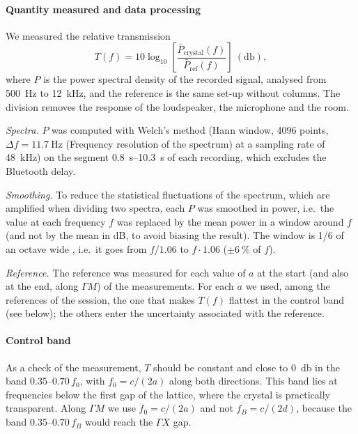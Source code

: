 \documentclass[9pt,a4paper,twocolumn]{extarticle}
\newcommand{\pbreak}{\par\vspace{3pt}}
\begin{document}
\paragraph{Quantity measured and data processing}
We measured the relative transmission
\begin{equation}
  T(f) = 10\log_{10}\!\left[\frac{\bar P_{\mathrm{crystal}}(f)}{\bar P_{\mathrm{ref}}(f)}\right]\ (\si{\decibel}),
\end{equation}
where $P$ is the power spectral density of the recorded signal, analysed from \SI{500}{\hertz} to \SI{12}{\kilo\hertz}, and the reference is the same set-up without columns. The division removes the response of the loudspeaker, the microphone and the room.
\pbreak
\emph{Spectra.} $P$ was computed with Welch's method (Hann window, 4096 points, $\Delta f = \SI{11.7}{\hertz}$ (Frequency resolution of the spectrum) at a sampling rate of \SI{48}{\kilo\hertz}) on the segment \SIrange{0.8}{10.3}{\second} of each recording, which excludes the Bluetooth delay.
\pbreak
\emph{Smoothing.} To reduce the statistical fluctuations of the spectrum, which are amplified when dividing two spectra, each $P$ was smoothed in power, i.e.\ the value at each frequency $f$ was replaced by the mean power in a window around $f$ (and not by the mean in dB, to avoid biasing the result). The window is 1/6 of an octave wide 
, i.e.\ it goes from $f/1.06$ to $f\cdot1.06$ ($\pm\SI{6}{\percent}$ of $f$).
\pbreak
\emph{Reference.} The reference was measured for each value of $a$ at the start (and also at the end, along $\Gamma M$) of the measurements. For each $a$ we used, among the references of the session, the one that makes $T(f)$ flattest in the control band (see below); the others enter the uncertainty associated with the reference.

\paragraph{Control band}
As a check of the measurement, $T$ should be constant and close to \SI{0}{\decibel} in the band $0.35$--$0.70\,f_0$, with $f_0 = c/(2a)$ along both directions. This band lies at frequencies below the first gap of the lattice, where the crystal is practically transparent. Along $\Gamma M$ we use $f_0 = c/(2a)$ and not $f_B = c/(2d)$, because the band $0.35$--$0.70\,f_B$ would reach the $\Gamma X$ gap.
\end{document}
